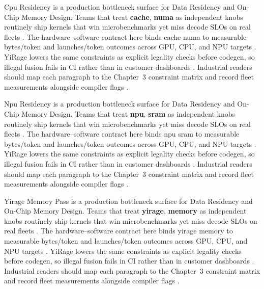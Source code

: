 Cpu Residency is a production bottleneck surface for Data Residency and On-Chip Memory Design. Teams that treat \textbf{cache}, \textbf{numa} as independent knobs routinely ship kernels that win microbenchmarks yet miss decode SLOs on real fleets \citep{dlbook,nvidia2024cudagraphs}. The hardware--software contract here binds cache numa to measurable bytes/token and launches/token outcomes across GPU, CPU, and NPU targets \citep{dao2022flashattention,liu2024deepseekv3}. YiRage lowers the same constraints as explicit legality checks before codegen, so illegal fusion fails in CI rather than in customer dashboards \citep{kwon2023vllm,patel2025llminference}. Industrial readers should map each paragraph to the Chapter~3 constraint matrix and record fleet measurements alongside compiler flags \citep{nvidia2024cudagraphs,taxbreak2026}.

Npu Residency is a production bottleneck surface for Data Residency and On-Chip Memory Design. Teams that treat \textbf{npu}, \textbf{sram} as independent knobs routinely ship kernels that win microbenchmarks yet miss decode SLOs on real fleets \citep{dao2022flashattention,liu2024deepseekv3}. The hardware--software contract here binds npu sram to measurable bytes/token and launches/token outcomes across GPU, CPU, and NPU targets \citep{kwon2023vllm,patel2025llminference}. YiRage lowers the same constraints as explicit legality checks before codegen, so illegal fusion fails in CI rather than in customer dashboards \citep{nvidia2024cudagraphs,taxbreak2026}. Industrial readers should map each paragraph to the Chapter~3 constraint matrix and record fleet measurements alongside compiler flags \citep{liu2024deepseekv3,memoryfloor2026}.

Yirage Memory Pass is a production bottleneck surface for Data Residency and On-Chip Memory Design. Teams that treat \textbf{yirage}, \textbf{memory} as independent knobs routinely ship kernels that win microbenchmarks yet miss decode SLOs on real fleets \citep{kwon2023vllm,patel2025llminference}. The hardware--software contract here binds yirage memory to measurable bytes/token and launches/token outcomes across GPU, CPU, and NPU targets \citep{nvidia2024cudagraphs,taxbreak2026}. YiRage lowers the same constraints as explicit legality checks before codegen, so illegal fusion fails in CI rather than in customer dashboards \citep{liu2024deepseekv3,memoryfloor2026}. Industrial readers should map each paragraph to the Chapter~3 constraint matrix and record fleet measurements alongside compiler flags \citep{patel2025llminference,nvidia2022hopper}.

